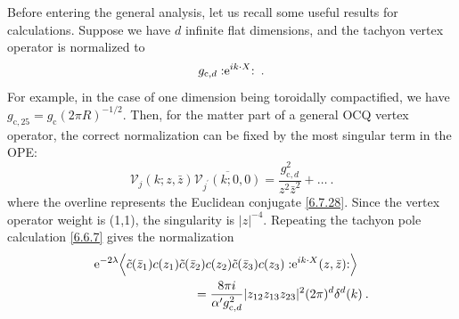 Before entering the general analysis, let us recall some useful results for calculations.
Suppose we have $d$ infinite flat dimensions, and the tachyon vertex operator is normalized to
\begin{equation}
	g_{\mathrm{c}, d} :\mathrel{\mathrm{e}^{i k \cdot X}}: \:. \label{9.1.1}
\end{equation}
For example, in the case of one dimension being toroidally compactified, we have $g_{\mathrm{c}, 25}=g_{\mathrm{c}}(2 \pi R)^{-1 / 2}$.
Then, for the matter part of a general OCQ vertex operator, the correct normalization can be fixed by the most singular term in the OPE:
\begin{equation}
	\mathscr{V}_{j}(k; z, \bar{z}) \overline{\mathscr{V}_{j^{\prime}}(k; 0,0)} = 
	\frac{g_{\mathrm{c}, d}^{2}}{z^{2} \bar{z}^{2}}+\ldots \:. \label{9.1.2}
\end{equation}
where the overline represents the Euclidean conjugate \eqref{6.7.28}. Since the vertex operator weight is (1,1), the singularity is $|z|^{-4}$.
Repeating the tachyon pole calculation \eqref{6.6.7} gives the normalization
\begin{align}
	& \mathrm{e}^{-2 \lambda} \Bigl\langle \tilde{c}(\bar{z}_{1}) c(z_{1}) \tilde{c}(\bar{z}_{2}) c(z_{2}) \tilde{c}(\bar{z}_{3}) 
	c(z_{3}) : \mathrel{\mathrm{e}^{i k \cdot X}(z, \bar{z})}:\Bigr\rangle \nonumber \\
	&\qquad \qquad \qquad \qquad =\frac{8 \pi i}{\alpha^{\prime} g_{\mathrm{c}, d}^{2}} 
	|z_{12} z_{13} z_{23}|^{2} (2 \pi)^{d} \delta^{d}(k) \:.
	\label{9.1.3}
\end{align}
